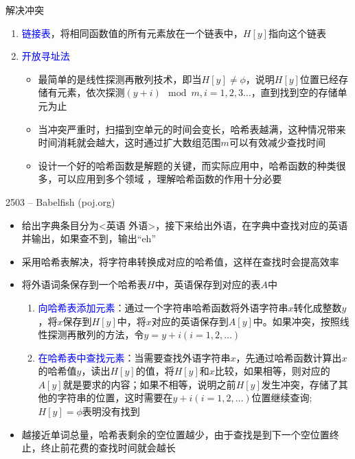\begin{frame}{解决冲突}
\begin{enumerate}
    \item \textcolor{blue}{链接表}，将相同函数值的所有元素放在一个链表中，$H[y]$指向这个链表
    \item \textcolor{blue}{开放寻址法}
    \begin{itemize}
        \item 最简单的是线性探测再散列技术，即当$H[y]\neq\phi$，说明$H[y]$位置已经存储有元素，依次探测$(y+i)\mod m, i=1,2,3\ldots$，直到找到空的存储单元为止
        \item 当冲突严重时，扫描到空单元的时间会变长，哈希表越满，这种情况带来时间消耗就会越大，这时通过扩大数组范围$m$可以有效减少查找时间
        \item 设计一个好的哈希函数是解题的关键，而实际应用中，哈希函数的种类很多，可以应用到多个领域 ，理解哈希函数的作用十分必要
    \end{itemize}
\end{enumerate}
\end{frame}
\begin{frame}{2503 -- Babelfish (poj.org)}
    \begin{itemize}
        \item 给出字典条目分为<英语 外语>，接下来给出外语，在字典中查找对应的英语并输出，如果查不到，输出“eh”
        \item 采用哈希表解决，将字符串转换成对应的哈希值，这样在查找时会提高效率
        \item 将外语词条保存到一个哈希表$H$中，英语保存到对应的表$A$中
        \begin{enumerate}[(1)]
            \item \textcolor{blue}{向哈希表添加元素}：通过一个字符串哈希函数将外语字符串$x$转化成整数$y$，将$x$保存到$H[y]$中，将$x$对应的英语保存到$A[y]$中。如果冲突，按照线性探测再散列的方法，令$y=y+i(i=1,2,\ldots )$
            \item \textcolor{blue}{在哈希表中查找元素}：当需要查找外语字符串$x$，先通过哈希函数计算出$x$的哈希值$y$，读出$H[y]$的值，将$H[y]$和$x$比较，如果相等，则对应的$A[y]$就是要求的内容；如果不相等，说明之前$H[y]$发生冲突，存储了其他的字符串的位置，这时需要在$y+i(i=1,2,\ldots )$位置继续查询;$H[y]=\phi$表明没有找到
        \end{enumerate}
        \item 越接近单词总量，哈希表剩余的空位置越少，由于查找是到下一个空位置终止，终止前花费的查找时间就会越长
    \end{itemize}
\end{frame}
